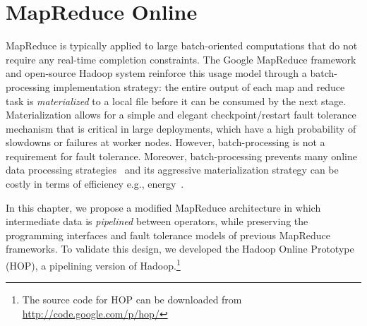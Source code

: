 \chapter[MapReduce Online]{MapReduce Online}
\label{ch:hop}

MapReduce is typically applied to large batch-oriented computations that do not
require any real-time completion constraints.  The Google MapReduce
framework~\cite{mapreduce-osdi} and open-source Hadoop system reinforce this
usage model through a batch-processing implementation strategy: the entire
output of each map and reduce task is \emph{materialized} to a local file
before it can be consumed by the next stage.  Materialization allows for a
simple and elegant checkpoint/restart fault tolerance mechanism that is
critical in large deployments, which have a high probability of slowdowns or
failures at worker nodes.  However, batch-processing is not a requirement for
fault tolerance.  Moreover, batch-processing prevents many online data
processing strategies~\cite{onlineagg, borealis, stream, tcq-cidr} and its
aggressive materialization strategy can be costly in terms of efficiency e.g.,
energy~\cite{yanpei}.

In this chapter, we propose a modified MapReduce architecture in which
intermediate data is \emph{pipelined} between operators, while preserving the
programming interfaces and fault tolerance models of previous MapReduce
frameworks.  To validate this design, we developed the Hadoop Online Prototype
(HOP), a pipelining version of Hadoop.\footnote{The source code for HOP can be
downloaded from \url{http://code.google.com/p/hop/}}


